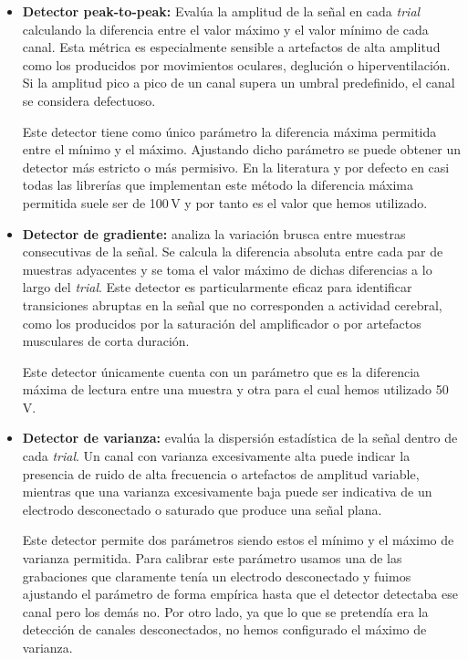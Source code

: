\begin{itemize}
    \item \textbf{Detector peak-to-peak:} Evalúa la amplitud de la señal en cada \textit{trial} calculando la diferencia entre el valor máximo y el valor mínimo de cada canal. Esta métrica es especialmente sensible a artefactos de alta amplitud como los producidos por movimientos oculares, deglución o hiperventilación. Si la amplitud pico a pico de un canal supera un umbral predefinido, el canal se considera defectuoso. 
    
    Este detector tiene como único parámetro la diferencia máxima permitida entre el mínimo y el máximo. Ajustando dicho parámetro se puede obtener un detector más estricto o más permisivo. En la literatura y por defecto en casi todas las librerías que implementan este método la diferencia máxima permitida suele ser de 100\,\textmu V y por tanto es el valor que hemos utilizado. 

    \item \textbf{Detector de gradiente:} analiza la variación brusca entre muestras consecutivas de la señal. Se calcula la diferencia absoluta entre cada par de muestras adyacentes y se toma el valor máximo de dichas diferencias a lo largo del \textit{trial}. Este detector es particularmente eficaz para identificar transiciones abruptas en la señal que no corresponden a actividad cerebral, como los producidos por la saturación del amplificador o por artefactos musculares de corta duración.
    
    Este detector únicamente cuenta con un parámetro que es la diferencia máxima de lectura entre una muestra y otra para el cual hemos utilizado 50\,\textmu V.

    \item \textbf{Detector de varianza:} evalúa la dispersión estadística de la señal dentro de cada \textit{trial}. Un canal con varianza excesivamente alta puede indicar la presencia de ruido de alta frecuencia o artefactos de amplitud variable, mientras que una varianza excesivamente baja puede ser indicativa de un electrodo desconectado o saturado que produce una señal plana. 

    Este detector permite dos parámetros siendo estos el mínimo y el máximo de varianza permitida. Para calibrar este parámetro usamos una de las grabaciones que claramente tenía un electrodo desconectado y fuimos ajustando el parámetro de forma empírica hasta que el detector detectaba ese canal pero los demás no. Por otro lado, ya que lo que se pretendía era la detección de canales desconectados, no hemos configurado el máximo de varianza.
\end{itemize}

